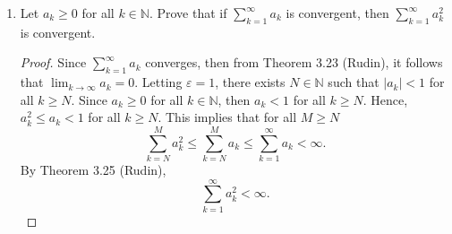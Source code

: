 \documentclass[12pt]{article}
\begin{document}
\begin{enumerate}
\begin{proof}
\begin{equation*}
                \end{equation*}
                Now assume that $\sum_{k=1}^{\infty}a_k<\infty$. Let
                $\varepsilon>0$ such that $\varepsilon<\lambda$. Then there
                exists $N\in\mathbb{N}$ such that 
                \begin{equation*}
                    \bigg|\frac{a_n}{b_n}-\lambda\bigg|<\varepsilon
                    \Leftrightarrow(\lambda-\varepsilon)b_n<a_n<(\lambda+\varepsilon)b_n 
                \end{equation*}
                for all $n\geq N$. This implies that for any $M\geq N$
                \begin{equation*}
                    \sum_{k=N}^{M}b_k<(\lambda-\varepsilon)\sum_{k=N}^{M}a_k
                    \leq(\lambda-\varepsilon)\sum_{k=1}^{\infty}a_k<\infty.
                \end{equation*}
                Since $\sum_{k=1}^{N-1}b_k<\infty$, then the sequence of
                partial sums $S_n=\sum_{k=1}^n b_k$ is bounded above. Since the
                sequence is monotincally increasing, then it converges.
                Therefore
                \begin{equation*}
                    \sum_{k=1}^{\infty}b_k<\infty.
                \end{equation*}
            \end{proof}
        \item Let $a_k\geq 0$ for all $k\in\mathbb{N}$. Prove that if
            $\sum_{k=1}^{\infty}a_k$ is convergent, then
            $\sum_{k=1}^{\infty}a^2_k$ is convergent. 
            \begin{proof}
                Since $\sum_{k=1}^{\infty}a_k$ converges, then from Theorem
                3.23 (Rudin), it follows that $\lim_{k\to\infty}a_k=0$. Letting
                $\varepsilon=1$, there exists $N\in\mathbb{N}$ such that
                $|a_k|<1$ for all $k\geq N$. Since $a_k\geq 0$ for all
                $k\in\mathbb{N}$, then $a_k<1$ for all $k\geq N$. Hence,
                $a_k^{2}\leq a_k<1$ for all $k\geq N$. This implies that for
                all $M\geq N$ 
                \begin{equation*}
                    \sum_{k=N}^{M}a^2_k\leq\sum_{k=N}^{M}a_k\leq\sum_{k=1}^{\infty}a_k<\infty.
                \end{equation*}
                By Theorem 3.25 (Rudin), 
                \begin{equation*}
                    \sum_{k=1}^{\infty}a^2_k<\infty.

\end{equation*}
\end{proof}
\end{enumerate}
\end{document}
